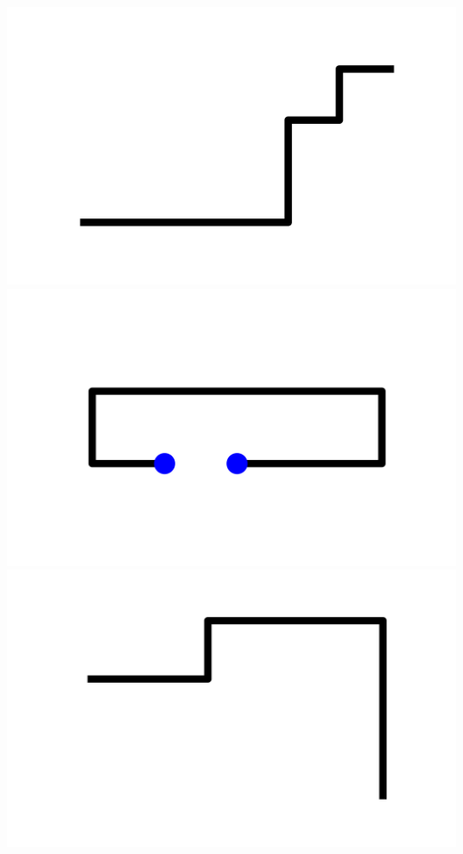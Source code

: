 \documentclass[]{report}
\begin{document}
\includegraphics[scale=.1]{pictures/21/state_cluster_shapes_448.pdf} 
\includegraphics[scale=.1]{pictures/21/state_cluster_shapes_449.pdf} 
\includegraphics[scale=.1]{pictures/21/state_cluster_shapes_450.pdf} 
\end{document}
